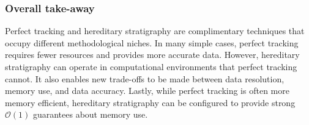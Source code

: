 
\subsubsection{Overall take-away}

Perfect tracking and hereditary stratigraphy are complimentary techniques that occupy different methodological niches.
In many simple cases, perfect tracking requires fewer resources and provides more accurate data.
However, hereditary stratigraphy can operate in computational environments that perfect tracking cannot.
It also enables new trade-offs to be made between data resolution, memory use, and data accuracy.
Lastly, while perfect tracking is often more memory efficient, hereditary stratigraphy can be configured to provide strong $\mathcal{O}(1)$ guarantees about memory use.

